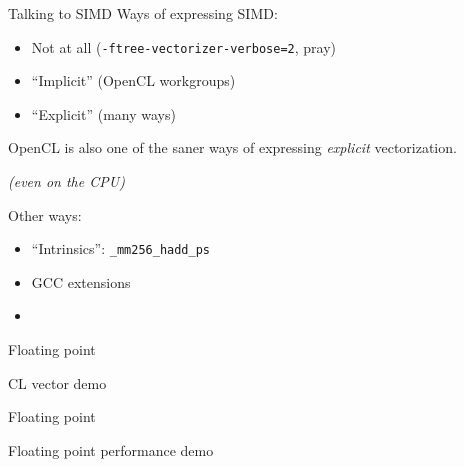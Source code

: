 \documentclass[english,compress]{beamer}
\begin{document}
\begin{frame}{Talking to SIMD}
  Ways of expressing SIMD:
  \begin{itemize}
    \item Not at all (\texttt{-ftree-vectorizer-verbose=2}, pray)
    \item ``Implicit'' (OpenCL workgroups)
    \item ``Explicit'' (many ways)
  \end{itemize}

  \bigskip
  OpenCL is also one of the saner ways of expressing
  \emph{explicit} vectorization.

  \emph{(even on the CPU)}

  \bigskip
  Other ways:
  \begin{itemize}
    \item ``Intrinsics'': \texttt{\_mm256\_hadd\_ps}
    \item GCC extensions
    \item {}
  \end{itemize}
\end{frame}
\begin{frame}{Floating point}
  \begin{center}
  \Huge CL vector demo
  \end{center}
\end{frame}
\begin{frame}{Floating point}
  \begin{center}
  \Huge Floating point performance demo
  \end{center}
\end{frame}
\end{document}
